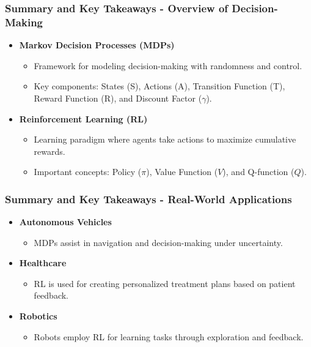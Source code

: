 \documentclass[aspectratio=169]{beamer}
\begin{document}
\begin{frame}[fragile]
  \frametitle{Summary and Key Takeaways - Overview of Decision-Making}
  \begin{itemize}
    \item \textbf{Markov Decision Processes (MDPs)}
      \begin{itemize}
        \item Framework for modeling decision-making with randomness and control.
        \item Key components: States (S), Actions (A), Transition Function (T), Reward Function (R), and Discount Factor ($\gamma$).
      \end{itemize}
      
    \item \textbf{Reinforcement Learning (RL)}
      \begin{itemize}
        \item Learning paradigm where agents take actions to maximize cumulative rewards.
        \item Important concepts: Policy ($\pi$), Value Function ($V$), and Q-function ($Q$).
      \end{itemize}
  \end{itemize}
\end{frame}

\begin{frame}[fragile]
  \frametitle{Summary and Key Takeaways - Real-World Applications}
  \begin{itemize}
    \item \textbf{Autonomous Vehicles}
      \begin{itemize}
        \item MDPs assist in navigation and decision-making under uncertainty.
      \end{itemize}
      
    \item \textbf{Healthcare}
      \begin{itemize}
        \item RL is used for creating personalized treatment plans based on patient feedback.
      \end{itemize}

    \item \textbf{Robotics}
      \begin{itemize}
        \item Robots employ RL for learning tasks through exploration and feedback.
      \end{itemize}
  \end{itemize}
\end{frame}
\end{document}
